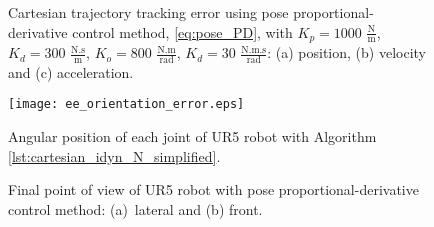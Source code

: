 \begin{figure}%
	\centering
	\caption{Cartesian trajectory tracking error using pose proportional-derivative control method, \eqref{eq:pose_PD}, with  ${K_{p}}=1000$ $\mathrm{\frac{N}{m}}$, $K_{d}= 300$ $\mathrm{\frac{N.s}{m}}$, ${K_{o}}=800$ $\mathrm{\frac{N.m}{rad}}$, $K_{d}= 30$ $\mathrm{\frac{N.m.s}{rad}}$: (a) position, (b) velocity and (c) acceleration.}
	\label{fig:act_3.1_ee_position_error}
\end{figure}

\begin{figure}
    \centering
    \texttt{[image: ee\_orientation\_error.eps]}	
    \caption{Angular position of each joint of UR5 robot with Algorithm \ref{lst:cartesian_idyn_N_simplified}.}
    \label{fig:act_3.1_ee_orientation_error}
\end{figure}

\begin{figure}
	\centering
	\hfill
	\caption{Final point of view of UR5 robot with pose proportional-derivative control method: (a)~lateral and (b) front.}
	\label{fig:act_3.1_ur5_pov}
\end{figure}